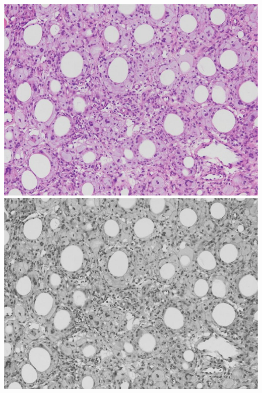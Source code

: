 \documentclass[a4paper]{article}
\begin{document}
\noindent
\begin{minipage}{0.24\textwidth}
    \centering
    \includegraphics[width=\textwidth]{../Task1.jpg}
    \includegraphics[width=\textwidth]{../code/task1/output/greyscale.jpg}
\end{minipage}
\hfill
\end{document}
